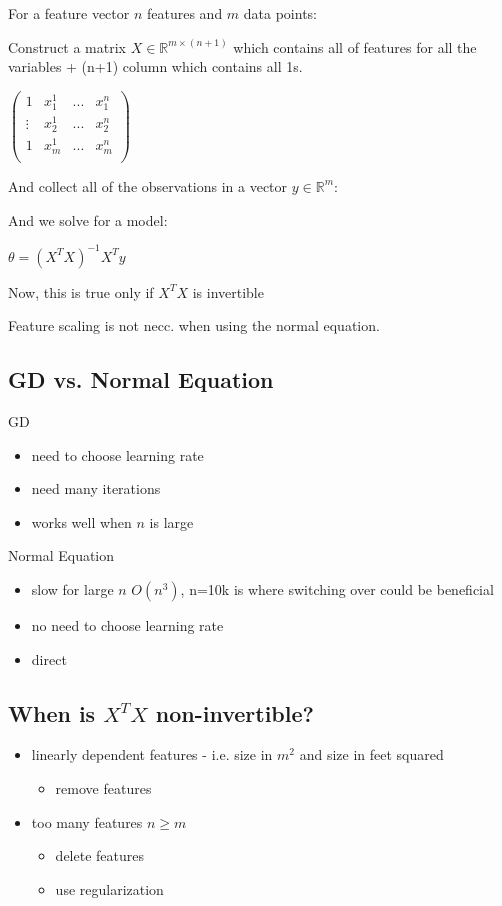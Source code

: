 For a feature vector $n$ features and $m$ data points: 

Construct a matrix $X  \in \mathbb{R}^{m\times (n+1)}$ which contains all of features for all the variables + (n+1) column which contains all 1s.

$\left( \begin{matrix} 1 & x_1^1 & ... & x_1^n \\ \vdots & x_2^1 & ... & x_2^n \\   1 & x_m^1 & ... & x_m^n \\ \end{matrix} \right)$

And collect all of the observations in a vector $y \in \mathbb{R}^m $:

And we solve for a model:

$\theta = (X^T X)^{-1} X^T y$



Now, this is true only if $X^T X$ is invertible

Feature scaling is not necc. when using the normal equation.

\subsection{GD vs. Normal Equation}

GD
\begin{itemize}
\item need to choose learning rate
\item need many iterations
\item works well when $n$ is large
\end{itemize}

Normal Equation 
\begin{itemize}
\item slow for large $n$  $O(n^3)$, n=10k is where switching over could be beneficial
\item no need to choose learning rate
\item direct
\end{itemize}

\subsection{When is $X^TX$ non-invertible?}

\begin{itemize}
\item linearly dependent features - i.e. size in $m^2$ and size in feet squared
\begin{itemize}
\item remove features
\end{itemize}
\item too many features $n\ge m$ 
\begin{itemize}
  \item delete features 
  \item use regularization
\end{itemize}
\end{itemize}

